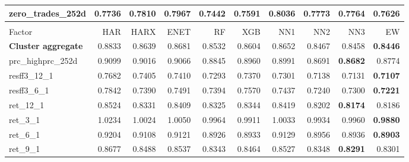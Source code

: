\begin{longtable}{>{\raggedright\arraybackslash}p{2.6cm}rrrrrrrrr}
zero\_trades\_252d & 0.7736 & 0.7810 & 0.7967 & \textbf{\cellcolor{blue!10}0.7442} & \cellcolor{blue!10}0.7591 & 0.8036 & 0.7773 & 0.7764 & \cellcolor{blue!10}0.7626 \\
\hline
\multicolumn{10}{@{}l}{\textit{Panel F. Momentum}} \\
\hline
Factor & HAR & HARX & ENET & RF & XGB & NN1 & NN2 & NN3 & EW \\
\hline
\textbf{Cluster aggregate} & 0.8833 & \cellcolor{blue!10}0.8639 & \cellcolor{blue!10}0.8681 & \cellcolor{blue!10}0.8532 & \cellcolor{blue!10}0.8604 & \cellcolor{blue!10}0.8652 & \cellcolor{blue!10}0.8467 & \cellcolor{blue!10}0.8458 & \textbf{\cellcolor{blue!10}0.8446} \\
prc\_highprc\_252d & 0.9099 & \cellcolor{blue!10}0.9016 & \cellcolor{blue!10}0.9066 & \cellcolor{blue!10}0.8845 & \cellcolor{blue!10}0.8960 & \cellcolor{blue!10}0.8991 & \cellcolor{blue!10}0.8691 & \textbf{\cellcolor{blue!10}0.8682} & \cellcolor{blue!10}0.8774 \\
resff3\_12\_1 & 0.7682 & \cellcolor{blue!10}0.7405 & \cellcolor{blue!10}0.7410 & \cellcolor{blue!10}0.7293 & \cellcolor{blue!10}0.7370 & \cellcolor{blue!10}0.7301 & \cellcolor{blue!10}0.7138 & \cellcolor{blue!10}0.7131 & \textbf{\cellcolor{blue!10}0.7107} \\
resff3\_6\_1 & 0.7842 & \cellcolor{blue!10}0.7390 & \cellcolor{blue!10}0.7491 & \cellcolor{blue!10}0.7394 & \cellcolor{blue!10}0.7570 & \cellcolor{blue!10}0.7437 & \cellcolor{blue!10}0.7240 & \cellcolor{blue!10}0.7300 & \textbf{\cellcolor{blue!10}0.7221} \\
ret\_12\_1 & 0.8524 & \cellcolor{blue!10}0.8331 & \cellcolor{blue!10}0.8409 & \cellcolor{blue!10}0.8325 & \cellcolor{blue!10}0.8344 & \cellcolor{blue!10}0.8419 & \cellcolor{blue!10}0.8202 & \textbf{\cellcolor{blue!10}0.8174} & \cellcolor{blue!10}0.8186 \\
ret\_3\_1 & 1.0234 & \cellcolor{blue!10}1.0024 & \cellcolor{blue!10}1.0050 & \cellcolor{blue!10}0.9964 & \cellcolor{blue!10}0.9911 & \cellcolor{blue!10}1.0033 & \cellcolor{blue!10}0.9934 & \cellcolor{blue!10}0.9960 & \textbf{\cellcolor{blue!10}0.9880} \\
ret\_6\_1 & 0.9204 & \cellcolor{blue!10}0.9108 & \cellcolor{blue!10}0.9121 & \cellcolor{blue!10}0.8926 & \cellcolor{blue!10}0.8933 & \cellcolor{blue!10}0.9129 & \cellcolor{blue!10}0.8956 & \cellcolor{blue!10}0.8936 & \textbf{\cellcolor{blue!10}0.8903} \\
ret\_9\_1 & 0.8677 & \cellcolor{blue!10}0.8488 & \cellcolor{blue!10}0.8537 & \cellcolor{blue!10}0.8343 & \cellcolor{blue!10}0.8464 & \cellcolor{blue!10}0.8527 & \cellcolor{blue!10}0.8348 & \textbf{\cellcolor{blue!10}0.8291} & \cellcolor{blue!10}0.8301 \\

\end{longtable}
